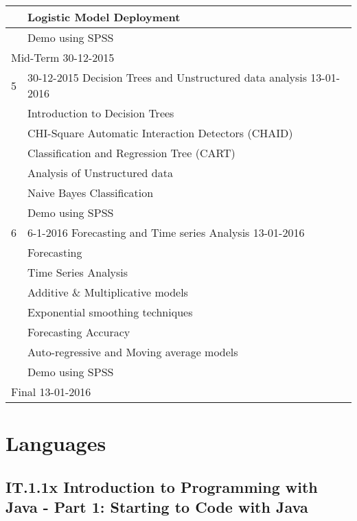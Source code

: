\documentclass[a4paper,12pt]{article} %
\begin{document}
\begin{longtable}{|l|p{11cm}|l|l|l|}
		\hline
		& Logistic Model Deployment & & & \\
		\hline
		& Demo using SPSS & & & \\
		\hline
		\multicolumn{5}{|l|}{Mid-Term \hfill 30-12-2015}\\
		\hline
		5 & \multicolumn{4}{|l|}{30-12-2015 \hfill Decision Trees and Unstructured data analysis \hfill 13-01-2016}\\
		\hline
		& Introduction to Decision Trees & & & \\
		\hline
		& CHI-Square Automatic Interaction Detectors (CHAID) & & & \\
		\hline
		& Classification and Regression Tree (CART) & & & \\
		\hline
		& Analysis of Unstructured data & & & \\
		\hline
		& Naive Bayes Classification & & & \\
		\hline
		& Demo using SPSS & & & \\
		\hline
		6 & \multicolumn{4}{|l|}{6-1-2016 \hfill Forecasting and Time series Analysis \hfill 13-01-2016}\\
		\hline
		& Forecasting & & & \\
		\hline
		& Time Series Analysis & & & \\
		\hline
		& Additive \& Multiplicative models & & & \\
		\hline
		& Exponential smoothing techniques & & & \\
		\hline
		& Forecasting Accuracy & & & \\
		\hline
		& Auto-regressive and Moving average models & & & \\
		\hline
		& Demo using SPSS & & & \\
		\hline
		\multicolumn{5}{|l|}{Final \hfill 13-01-2016}\\
		\hline
\end{longtable}

\newpage
\section{Languages}
\subsection{IT.1.1x Introduction to Programming with Java - Part 1: Starting to Code with Java}
\end{document}
